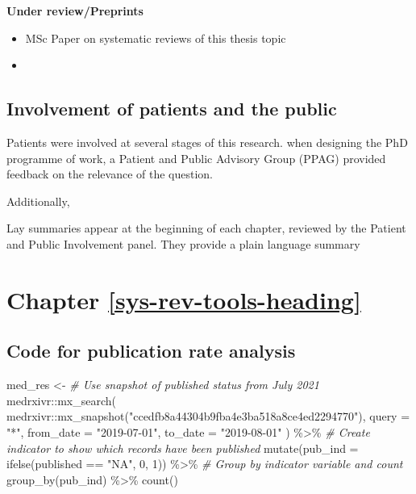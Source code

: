 \documentclass[a4paper, twoside]{templates/ociamthesis}
\newenvironment{Shaded}{\begin{snugshade}}{\end{snugshade}}
\newcommand{\AttributeTok}[1]{\textcolor[rgb]{0.77,0.63,0.00}{#1}}
\newcommand{\CommentTok}[1]{\textcolor[rgb]{0.56,0.35,0.01}{\textit{#1}}}
\newcommand{\DecValTok}[1]{\textcolor[rgb]{0.00,0.00,0.81}{#1}}
\newcommand{\FunctionTok}[1]{\textcolor[rgb]{0.00,0.00,0.00}{#1}}
\newcommand{\NormalTok}[1]{#1}
\newcommand{\OtherTok}[1]{\textcolor[rgb]{0.56,0.35,0.01}{#1}}
\newcommand{\SpecialCharTok}[1]{\textcolor[rgb]{0.00,0.00,0.00}{#1}}
\newcommand{\StringTok}[1]{\textcolor[rgb]{0.31,0.60,0.02}{#1}}
\renewenvironment{Shaded}
{
  \vspace{4pt}%
  \begin{snugshade}%
}{%
  \end{snugshade}%
  \vspace{4pt}%
}
\begin{document}
\textbf{Under review/Preprints}

\begin{itemize}
\item
  MSc Paper on systematic reviews of this thesis topic
\item
\end{itemize}

\hypertarget{appendix-ppi}{%
\subsection{Involvement of patients and the public}\label{appendix-ppi}}

Patients were involved at several stages of this research. when designing the PhD programme of work, a Patient and Public Advisory Group (PPAG) provided feedback on the relevance of the question.

Additionally,

Lay summaries appear at the beginning of each chapter, reviewed by the Patient and Public Involvement panel. They provide a plain language summary

\hypertarget{appendix-sys-rev-tools}{%
\section{Chapter \ref{sys-rev-tools-heading}}\label{appendix-sys-rev-tools}}

\hypertarget{code-for-publication-rate-analysis}{%
\subsection{Code for publication rate analysis}\label{code-for-publication-rate-analysis}}

\begin{Shaded}
\begin{Highlighting}[]
\NormalTok{med\_res }\OtherTok{\textless{}{-}}
  \CommentTok{\# Use snapshot of published status from July 2021}
\NormalTok{  medrxivr}\SpecialCharTok{::}\FunctionTok{mx\_search}\NormalTok{(}
\NormalTok{    medrxivr}\SpecialCharTok{::}\FunctionTok{mx\_snapshot}\NormalTok{(}\StringTok{"ccedfb8a44304b9fba4e3ba518a8ce4ed2294770"}\NormalTok{),}
    \AttributeTok{query =} \StringTok{"*"}\NormalTok{,}
    \AttributeTok{from\_date =} \StringTok{"2019{-}07{-}01"}\NormalTok{,}
    \AttributeTok{to\_date =} \StringTok{"2019{-}08{-}01"}
\NormalTok{  ) }\SpecialCharTok{\%\textgreater{}\%}
  \CommentTok{\# Create indicator to show which records have been published}
  \FunctionTok{mutate}\NormalTok{(}\AttributeTok{pub\_ind =} \FunctionTok{ifelse}\NormalTok{(published }\SpecialCharTok{==} \StringTok{"NA"}\NormalTok{, }\DecValTok{0}\NormalTok{, }\DecValTok{1}\NormalTok{)) }\SpecialCharTok{\%\textgreater{}\%}
  \CommentTok{\# Group by indicator variable and count}
  \FunctionTok{group\_by}\NormalTok{(pub\_ind) }\SpecialCharTok{\%\textgreater{}\%}
  \FunctionTok{count}\NormalTok{() }
\end{Highlighting}
\end{Shaded}
\end{document}
